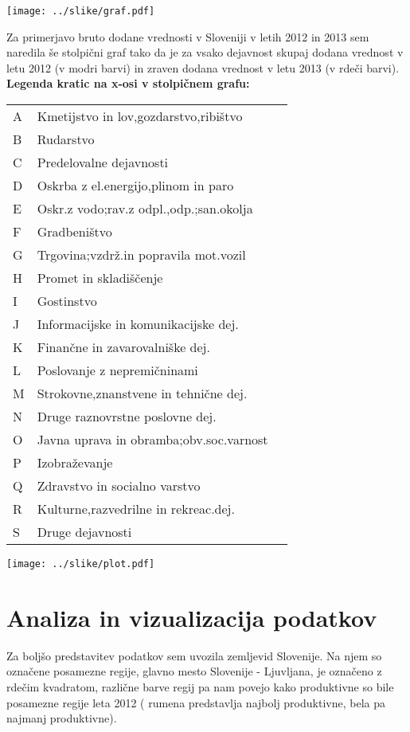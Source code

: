 \documentclass[a4paper, 11pt]{article}
\begin{document}
\begin{center}
\texttt{[image: ../slike/graf.pdf]}
\end{center}






Za primerjavo bruto dodane vrednosti v Sloveniji v letih 2012 in 2013 sem naredila še stolpični graf tako da je za vsako dejavnost skupaj dodana vrednost v letu 2012 (v  modri barvi) in zraven dodana vrednost v letu 2013 (v rdeči barvi). 
\newline
\textbf{Legenda kratic na x-osi v stolpičnem grafu:}
\begin{table}[h]
\begin{tabular}{lll}
A  & Kmetijstvo in lov,gozdarstvo,ribištvo \\
B & Rudarstvo  \\
C & Predelovalne dejavnosti  \\
D & Oskrba z el.energijo,plinom in paro	\\
E & Oskr.z vodo;rav.z odpl.,odp.;san.okolja	\\
F & Gradbeništvo	\\
G & Trgovina;vzdrž.in popravila mot.vozil	\\
H & Promet in skladiščenje	\\
I & Gostinstvo	\\
J & Informacijske in komunikacijske dej.\\	
K & Finančne in zavarovalniške dej.	\\
L & Poslovanje z nepremičninami	\\
M & Strokovne,znanstvene in tehnične dej.	\\
N & Druge raznovrstne poslovne dej.	\\
O & Javna uprava in obramba;obv.soc.varnost \\
P & Izobraževanje	\\
Q & Zdravstvo in socialno varstvo	\\
R & Kulturne,razvedrilne in rekreac.dej.\\	
S & Druge dejavnosti
\end{tabular}
\end{table}


\begin{center}

\texttt{[image: ../slike/plot.pdf]}

\end{center}


\section{Analiza in vizualizacija podatkov}
Za boljšo predstavitev podatkov sem uvozila zemljevid Slovenije. Na njem so označene posamezne regije, glavno mesto Slovenije - Ljuvljana, je označeno z rdečim kvadratom, različne barve regij pa nam povejo kako produktivne so bile posamezne regije leta 2012 ( rumena predstavlja najbolj produktivne, bela pa najmanj produktivne).
\end{document}
